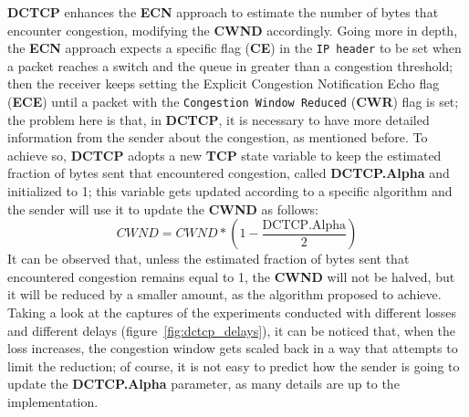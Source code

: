 \documentclass{exam}
\begin{document}
\textbf{DCTCP} enhances the \textbf{ECN} approach to estimate the number of bytes that encounter congestion, modifying the \textbf{CWND} accordingly. Going more in depth, the \textbf{ECN} approach expects a specific flag (\textbf{CE}) in the \texttt{IP header} to be set when a packet reaches a switch and the queue in greater than a congestion threshold; then the receiver keeps setting the Explicit Congestion Notification Echo flag (\textbf{ECE}) until a packet with the \texttt{Congestion Window Reduced} (\textbf{CWR}) flag is set; the problem here is that, in \textbf{DCTCP}, it is necessary to have more detailed information from the sender about the congestion, as mentioned before. To achieve so, \textbf{DCTCP} adopts a new \textbf{TCP} state variable to keep the estimated fraction of bytes sent that encountered congestion, called \textbf{DCTCP.Alpha} and initialized to 1; this variable gets updated according to a specific algorithm and the sender will use it to update the \textbf{CWND} as follows:
\[
CWND = CWND * \left(1 - \frac{\text{DCTCP.Alpha}}{2}\right)
\]
It can be observed that, unless the estimated fraction of bytes sent that encountered congestion remains equal to 1, the \textbf{CWND} will not be halved, but it will be reduced by a smaller amount, as the algorithm proposed to achieve. Taking a look at the captures of the experiments conducted with different losses and different delays (figure~\ref{fig:dctcp_delays}), it can be noticed that, when the loss increases, the congestion window gets scaled back in a way that attempts to limit the reduction; of course, it is not easy to predict how the sender is going to update the \textbf{DCTCP.Alpha} parameter, as many details are up to the implementation.
\end{document}
